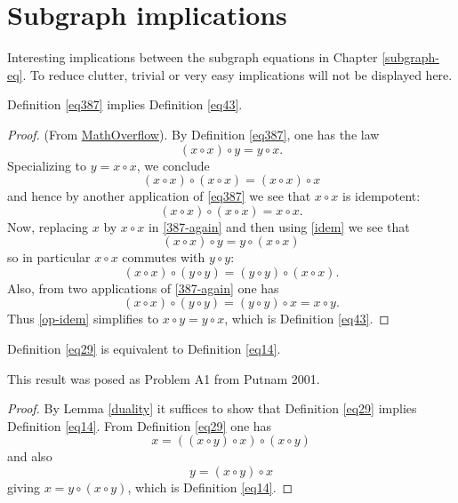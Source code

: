 \chapter{Subgraph implications}

Interesting implications between the subgraph equations in Chapter \ref{subgraph-eq}. To reduce clutter, trivial or very easy implications will not be displayed here.

\begin{theorem}[387 implies 43]\label{387_implies_43}\leanok  Definition \ref{eq387} implies Definition \ref{eq43}.
\end{theorem}

\begin{proof}\leanok (From \href{https://mathoverflow.net/a/450905/766}{MathOverflow}).
  By Definition \ref{eq387}, one has the law
\begin{equation}\label{387-again}
  (x \circ x) \circ y = y \circ x.
\end{equation}
Specializing to $y=x \circ x$, we conclude
$$(x \circ x) \circ (x \circ x) = (x \circ x) \circ x$$
and hence by another application of \eqref{eq387} we see that $x \circ x$ is idempotent:
\begin{equation}\label{idem}
  (x \circ x) \circ (x \circ x) = x \circ x.
\end{equation}
Now, replacing $x$ by $x \circ x$ in \eqref{387-again} and then using \eqref{idem} we see that
$$ (x \circ x) \circ y = y \circ (x \circ x)$$
so in particular $x \circ x$ commutes with $y \circ y$:
\begin{equation}\label{op-idem} (x \circ x) \circ (y \circ y) = (y \circ y) \circ (x \circ x).
\end{equation}
Also, from two applications of \eqref{387-again} one has
$$(x \circ x) \circ (y \circ y) = (y \circ y) \circ x = x \circ y.$$
Thus \eqref{op-idem} simplifies to $x \circ y = y \circ x$, which is Definition \ref{eq43}.
\end{proof}

\begin{theorem}[29 equivalent to 14]\label{29_equiv_14} \leanok  Definition \ref{eq29} is equivalent to Definition \ref{eq14}.
\end{theorem}

This result was posed as  Problem A1 from Putnam 2001.

\begin{proof}\leanok{} By Lemma \ref{duality} it suffices to show that Definition \ref{eq29} implies Definition \ref{eq14}.  From Definition \ref{eq29} one has
  $$ x = ((x \circ y) \circ x) \circ (x \circ y)$$
  and also
  $$ y = (x \circ y) \circ x$$
  giving $x = y \circ (x \circ y)$, which is Definition \ref{eq14}.
\end{proof}


